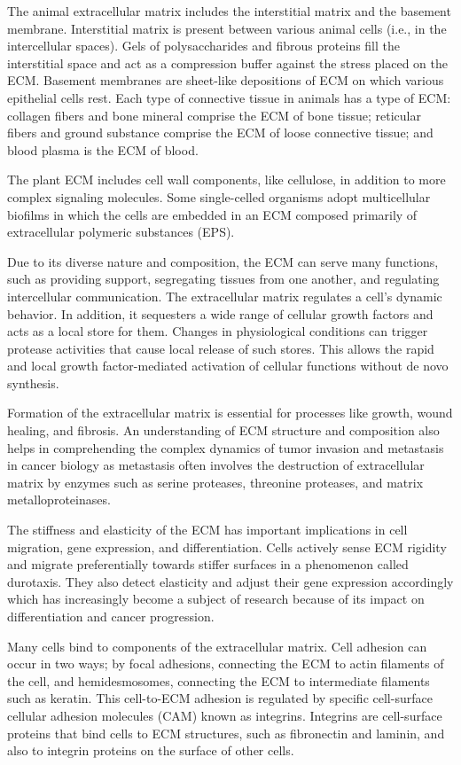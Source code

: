 The animal extracellular matrix includes the interstitial matrix and the basement membrane. Interstitial matrix is present between various animal cells (i.e., in the intercellular spaces). Gels of polysaccharides and fibrous proteins fill the interstitial space and act as a compression buffer against the stress placed on the ECM. Basement membranes are sheet-like depositions of ECM on which various epithelial cells rest. Each type of connective tissue in animals has a type of ECM: collagen fibers and bone mineral comprise the ECM of bone tissue; reticular fibers and ground substance comprise the ECM of loose connective tissue; and blood plasma is the ECM of blood.

The plant ECM includes cell wall components, like cellulose, in addition to more complex signaling molecules. Some single-celled organisms adopt multicellular biofilms in which the cells are embedded in an ECM composed primarily of extracellular polymeric substances (EPS).

Due to its diverse nature and composition, the ECM can serve many functions, such as providing support, segregating tissues from one another, and regulating intercellular communication. The extracellular matrix regulates a cell's dynamic behavior. In addition, it sequesters a wide range of cellular growth factors and acts as a local store for them. Changes in physiological conditions can trigger protease activities that cause local release of such stores. This allows the rapid and local growth factor-mediated activation of cellular functions without de novo synthesis.

Formation of the extracellular matrix is essential for processes like growth, wound healing, and fibrosis. An understanding of ECM structure and composition also helps in comprehending the complex dynamics of tumor invasion and metastasis in cancer biology as metastasis often involves the destruction of extracellular matrix by enzymes such as serine proteases, threonine proteases, and matrix metalloproteinases.

The stiffness and elasticity of the ECM has important implications in cell migration, gene expression, and differentiation. Cells actively sense ECM rigidity and migrate preferentially towards stiffer surfaces in a phenomenon called durotaxis. They also detect elasticity and adjust their gene expression accordingly which has increasingly become a subject of research because of its impact on differentiation and cancer progression.

Many cells bind to components of the extracellular matrix. Cell adhesion can occur in two ways; by focal adhesions, connecting the ECM to actin filaments of the cell, and hemidesmosomes, connecting the ECM to intermediate filaments such as keratin. This cell-to-ECM adhesion is regulated by specific cell-surface cellular adhesion molecules (CAM) known as integrins. Integrins are cell-surface proteins that bind cells to ECM structures, such as fibronectin and laminin, and also to integrin proteins on the surface of other cells.

